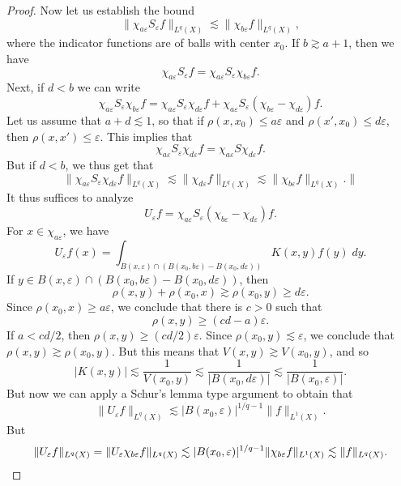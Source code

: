 \begin{proof}
    Now let us establish the bound
    \[ \| \chi_{a \varepsilon} S_\varepsilon f \|_{L^q(X)} \lesssim \| \chi_{b \varepsilon} f \|_{L^q(X)}, \]
    where the indicator functions are of balls with center $x_0$. If $b \gtrsim a + 1$, then we have
    \[ \chi_{a \varepsilon} S_\varepsilon f = \chi_{a \varepsilon} S_\varepsilon \chi_{b \varepsilon} f. \]
    Next, if $d < b$ we can write
    \[ \chi_{a \varepsilon} S_\varepsilon \chi_{b \varepsilon} f = \chi_{a \varepsilon} S_\varepsilon \chi_{d \varepsilon} f + \chi_{a \varepsilon} S_\varepsilon (\chi_{b \varepsilon} - \chi_{d \varepsilon}) f. \]
    Let us assume that $a + d \lesssim 1$, so that if $\rho(x,x_0) \leq a \varepsilon$ and $\rho(x',x_0) \leq d \varepsilon$, then $\rho(x,x') \leq \varepsilon$. This implies that
    \[ \chi_{a \varepsilon} S_\varepsilon \chi_{d \varepsilon} f = \chi_{a \varepsilon} S \chi_{d \varepsilon} f. \]
    But if $d < b$, we thus get that
    \[ \| \chi_{a \varepsilon} S_\varepsilon \chi_{d \varepsilon} f \|_{L^q(X)} \lesssim \| \chi_{d \varepsilon} f \|_{L^q(X)} \lesssim \| \chi_{b \varepsilon} f \|_{L^q(X)}. \| \]
    It thus suffices to analyze
    \[ U_\varepsilon f = \chi_{a \varepsilon} S_\varepsilon (\chi_{b \varepsilon} - \chi_{d \varepsilon}) f. \]
    For $x \in \chi_{a \varepsilon}$, we have
    \[ U_\varepsilon f(x) = \int_{B(x,\varepsilon) \cap ( B(x_0, b \varepsilon) - B(x_0,d\varepsilon) )} K(x,y) f(y)\; dy. \]
    If $y \in B(x,\varepsilon) \cap ( B(x_0, b \varepsilon) - B(x_0, d \varepsilon))$, then
    \[ \rho(x,y) + \rho(x_0,x) \gtrsim \rho(x_0,y) \geq d \varepsilon. \]
    Since $\rho(x_0,x) \geq a \varepsilon$, we conclude that there is $c > 0$ such that
    \[ \rho(x,y) \geq (cd - a) \varepsilon. \]
    If $a < cd/2$, then $\rho(x,y) \geq (cd/2) \varepsilon$. Since $\rho(x_0,y) \lesssim \varepsilon$, we conclude that $\rho(x,y) \gtrsim \rho(x_0,y)$. But this means that $V(x,y) \gtrsim V(x_0,y)$, and so
    \[ |K(x,y)| \lesssim \frac{1}{V(x_0,y)} \lesssim \frac{1}{|B(x_0,d \varepsilon)|} \lesssim \frac{1}{|B(x_0,\varepsilon)|}. \]
    But now we can apply a Schur's lemma type argument to obtain that
    \[ \| U_\varepsilon f \|_{L^q(X)} \lesssim |B(x_0,\varepsilon)|^{1/q-1} \| f \|_{L^1(X)}. \]
    But
    \[ \| U_\varepsilon f \|_{L^q(X)} = \| U_\varepsilon \chi_{b \varepsilon} f \|_{L^q(X)} \lesssim |B(x_0,\varepsilon)|^{1/q-1} \| \chi_{b\varepsilon} f \|_{L^1(X)} \lesssim \| f \|_{L^q(X)}. \qedhere  \]
\end{proof}

